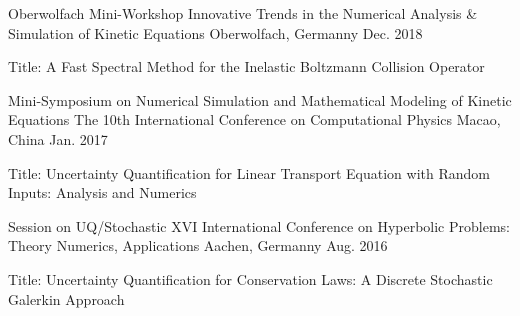 

\begin{cventries}

  \cventry
    {Oberwolfach Mini-Workshop} %
    {Innovative Trends in the Numerical Analysis \& Simulation of
      Kinetic Equations} %
    {Oberwolfach, Germanny} %
    {Dec. 2018} %
    {
      \begin{cvitems} %
        \item {Title: A Fast Spectral Method for the Inelastic Boltzmann
          Collision Operator}
      \end{cvitems}
    }

  \cventry
    {Mini-Symposium on Numerical Simulation and Mathematical Modeling of
      Kinetic Equations} %
    {The 10th International Conference on Computational Physics} %
    {Macao, China} %
    {Jan. 2017} %
    {
      \begin{cvitems} %
        \item {Title: Uncertainty Quantification for Linear Transport Equation
          with Random Inputs: Analysis and Numerics}
      \end{cvitems}
    }

  \cventry
    {Session on UQ/Stochastic} %
    {XVI International Conference on Hyperbolic Problems: Theory Numerics,
      Applications} %
    {Aachen, Germanny} %
    {Aug. 2016} %
    {
      \begin{cvitems} %
        \item {Title: Uncertainty Quantification for Conservation Laws: A
          Discrete Stochastic Galerkin Approach}
      \end{cvitems}
    }

\end{cventries}

